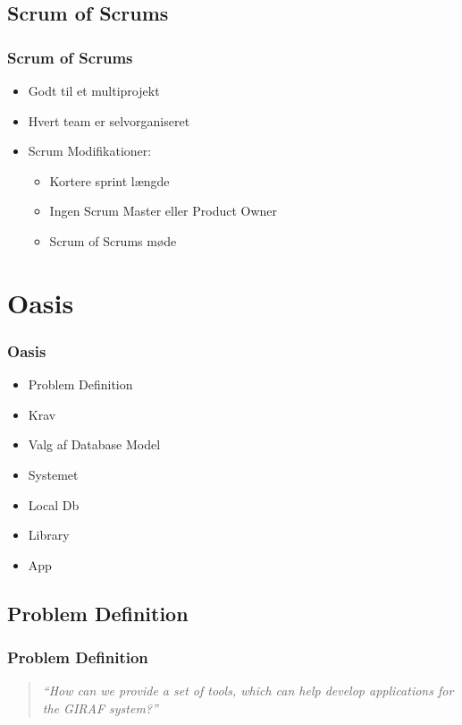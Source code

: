 \documentclass{beamer}
\begin{document}
\subsection{Scrum of Scrums}

\begin{frame}
	\frametitle{Scrum of Scrums}
	
	\begin{itemize}
		\item Godt til et multiprojekt
		\item Hvert team er selvorganiseret
		\item Scrum Modifikationer:
			\begin{itemize}
				\item Kortere sprint l\ae{}ngde
				\item Ingen Scrum Master eller Product Owner
				\item Scrum of Scrums m\o{}de 
			\end{itemize}
	\end{itemize}
\end{frame}

\section{Oasis}

\begin{frame}
	\frametitle{Oasis}
	\begin{itemize}
		\item Problem Definition
		\item Krav
		\item Valg af Database Model
		\item Systemet
		\item Local Db
		\item Library
		\item App
	\end{itemize}
\end{frame}

\subsection{Problem Definition}

\begin{frame}
	\frametitle{Problem Definition}
	
	\begin{quote}
	\textit{``How can we provide a set of tools, which can help develop applications for the GIRAF system?''}
	\end{quote}
\end{frame}
\end{document}
